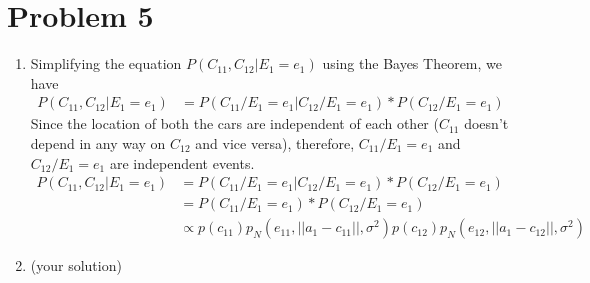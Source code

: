 \documentclass[12pt]{article}
\begin{document}
\section*{Problem 5}

\begin{enumerate}[label=(\alph*)]
  \item Simplifying the equation $P (C_{11}, C_{12} | E_1 = e_1)$ using the Bayes Theorem, we have
  \begin{align*}
  P (C_{11}, C_{12} | E_1 = e_1) &= P(C_{11}/E_1 = e_1 | C_{12}/E_1 = e_1) * P(C_{12}/E_1 = e_1)
  \end{align*}
  Since the location of both the cars are independent of each other ($C_{11}$ doesn't depend in any way on $C_{12}$ and vice versa), therefore, $C_{11}/E_1 = e_1$ and $C_{12}/E_1 = e_1$ are independent events.
    \begin{align*}
  P (C_{11}, C_{12} | E_1 = e_1) &= P(C_{11}/E_1 = e_1 | C_{12}/E_1 = e_1) * P(C_{12}/E_1 = e_1) \\
  &= P(C_{11}/E_1 = e_1) * P(C_{12}/E_1 = e_1) \\
  &\propto p(c_{11})p_N (e_{11}, || a_1 - c_{11} ||, \sigma^2) p(c_{12})p_N (e_{12}, || a_1 - c_{12} ||, \sigma^2)
  \end{align*}
  \item (your solution)
\end{enumerate}
\end{document}
